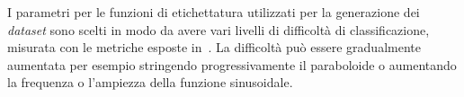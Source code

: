 I parametri per le funzioni di etichettatura utilizzati per la generazione dei \emph{dataset} sono scelti in modo da avere vari livelli di difficoltà di classificazione, misurata con le metriche esposte in~.
La difficoltà può essere gradualmente aumentata per esempio stringendo progressivamente il paraboloide o aumentando la frequenza o l'ampiezza della funzione sinusoidale.

